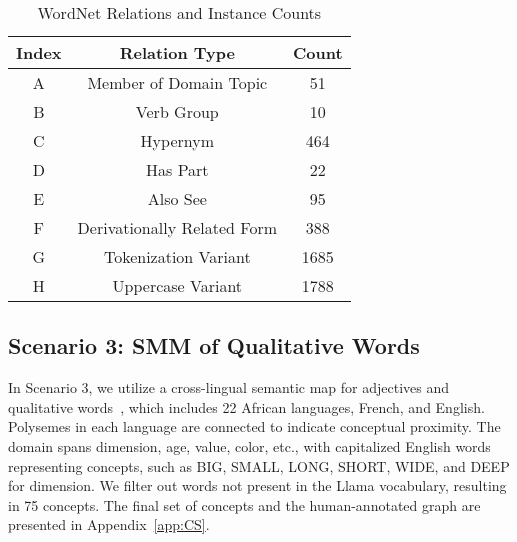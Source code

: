 \begin{table}[h!]
\centering
\begin{tabular}{ccc}
\toprule
Index & Relation Type & Count \\
\midrule
A & Member of Domain Topic & 51 \\
B & Verb Group & 10 \\
C & Hypernym & 464 \\
D & Has Part & 22 \\
E & Also See & 95 \\
F & Derivationally Related Form & 388 \\
G & Tokenization Variant & 1685 \\
H & Uppercase Variant & 1788 \\
\bottomrule
\end{tabular}
\caption{WordNet Relations and Instance Counts}
\label{tab:relation}
\end{table}

\subsection{Scenario 3: SMM of Qualitative Words}
In Scenario 3, we utilize a cross-lingual semantic map for adjectives and qualitative words~\cite{perrin2010polysemous}, which includes 22 African languages, French, and English. Polysemes in each language are connected to indicate conceptual proximity. The domain spans dimension, age, value, color, etc., with capitalized English words representing concepts, such as BIG, SMALL, LONG, SHORT, WIDE, and DEEP for dimension. We filter out words not present in the Llama vocabulary, resulting in 75 concepts. The final set of concepts and the human-annotated graph are presented in Appendix~\ref{app:CS}.

